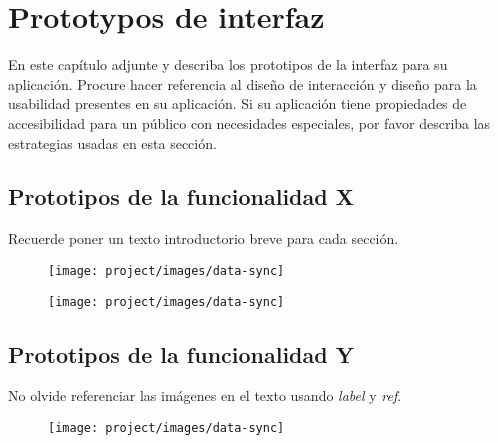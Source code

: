 \chapter{Prototypos de interfaz}
En este capítulo adjunte y describa los prototipos de la interfaz para su aplicación. Procure hacer referencia al diseño de interacción y diseño para la usabilidad presentes en su aplicación.
Si su aplicación tiene propiedades de accesibilidad para un público con necesidades especiales, por favor describa las estrategias usadas en esta sección.

\section{Prototipos de la funcionalidad X}
Recuerde poner un texto introductorio breve para cada sección.
\vspace{2cm}
\begin{figure}[H]
  \centering
    \texttt{[image: project/images/data-sync]}
\end{figure}
\newpage
\begin{figure}[H]
  \centering
    \texttt{[image: project/images/data-sync]}
\end{figure}
\vspace{1cm}

\section{Prototipos de la funcionalidad Y}
No olvide referenciar las imágenes en el texto usando \emph{label} y \emph{ref}.

\begin{figure}[H]
  \centering
    \texttt{[image: project/images/data-sync]}
\end{figure}